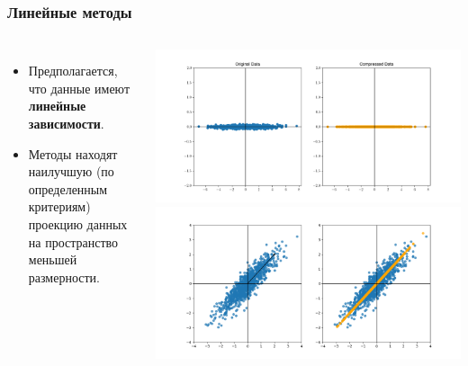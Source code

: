 \begin{frame}
    \frametitle{Линейные методы}
    \begin{columns}
        \begin{itemize}
            \item Предполагается, что данные имеют \textbf{линейные зависимости}.
            \item Методы находят наилучшую (по определенным критериям) проекцию данных на пространство меньшей размерности.
        \end{itemize}
        \begin{center}
            \includegraphics[width=.9\textwidth]{../resources/pca/simple_example_both.png}
            \includegraphics[width=.9\textwidth]{../resources/methods/pca.png}
        \end{center}
    \end{columns}
\end{frame}

